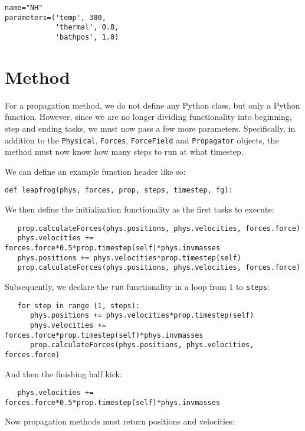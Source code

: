 \documentclass[11pt]{report}
\begin{document}
\begin{verbatim}
name="NH"
parameters=('temp', 300,
            'thermal', 0.8,
            'bathpos', 1.0)
\end{verbatim}


\section{Method}

For a propagation method, we do not define any Python class,
but only a Python function.   However, since we are no longer
dividing functionality into beginning, step and ending tasks,
we must now pass a few more parameters.  Specifically, in addition
to the \texttt{Physical}, \texttt{Forces}, \texttt{ForceField} 
and \texttt{Propagator} objects, the method must now know how many 
steps to run at what timestep.

We can define an example function header like so:
\begin{verbatim}
def leapfrog(phys, forces, prop, steps, timestep, fg):
\end{verbatim}

We then define the initialization functionality as the first
tasks to execute:

\begin{verbatim}
   prop.calculateForces(phys.positions, phys.velocities, forces.force)
   phys.velocities += forces.force*0.5*prop.timestep(self)*phys.invmasses
   phys.positions += phys.velocities*prop.timestep(self)
   prop.calculateForces(phys.positions, phys.velocities, forces.force)
\end{verbatim}

Subsequently, we declare the \texttt{run} functionality in
a loop from 1 to \texttt{steps}:

\begin{verbatim}
   for step in range (1, steps):
      phys.positions += phys.velocities*prop.timestep(self)
      phys.velocities += forces.force*prop.timestep(self)*phys.invmasses
      prop.calculateForces(phys.positions, phys.velocities, forces.force)
\end{verbatim}

And then the finishing half kick:

\begin{verbatim}
   phys.velocities += forces.force*0.5*prop.timestep(self)*phys.invmasses
\end{verbatim}

Now propagation methods must return positions and velocities:
\end{document}
